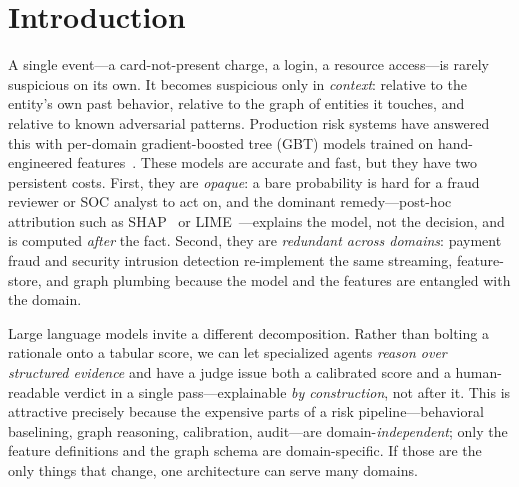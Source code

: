 \documentclass[sigconf,nonacm,screen]{acmart}
\begin{document}

\maketitle

\pagestyle{plain}
\thispagestyle{plain}

\section{Introduction}

A single event---a card-not-present charge, a login, a resource access---is
rarely suspicious on its own. It becomes suspicious only in \emph{context}:
relative to the entity's own past behavior, relative to the graph of entities
it touches, and relative to known adversarial patterns. Production risk systems
have answered this with per-domain gradient-boosted tree (GBT) models trained on
hand-engineered features~\cite{chen2018xgboost,stripe_radar}. These models are
accurate and fast, but they have two persistent costs. First, they are
\emph{opaque}: a bare probability is hard for a fraud reviewer or SOC analyst to
act on, and the dominant remedy---post-hoc attribution such as
SHAP~\cite{lundberg2017shap} or LIME~\cite{ribeiro2016lime}---explains the model,
not the decision, and is computed \emph{after} the fact. Second, they are
\emph{redundant across domains}: payment fraud and security intrusion detection
re-implement the same streaming, feature-store, and graph plumbing because the
model and the features are entangled with the domain.

Large language models invite a different decomposition. Rather than bolting a
rationale onto a tabular score, we can let specialized agents \emph{reason over
structured evidence} and have a judge issue both a calibrated score and a
human-readable verdict in a single pass---explainable \emph{by construction}, not
after it. This is attractive precisely because the expensive parts of a risk
pipeline---behavioral baselining, graph reasoning, calibration, audit---are
domain-\emph{independent}; only the feature definitions and the graph schema are
domain-specific. If those are the only things that change, one architecture can
serve many domains.
\end{document}
